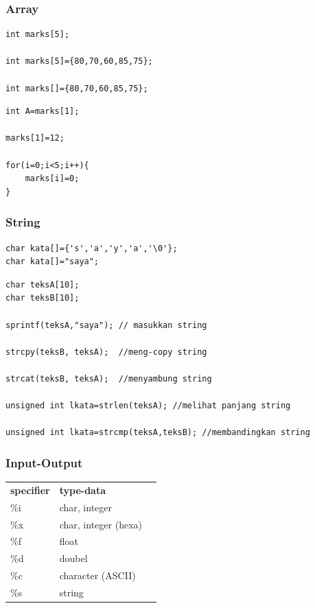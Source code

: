 \documentclass[12pt,]{article}
\begin{document}
	\subsubsection{Array}
	\begin{verbatim}
int marks[5];

int marks[5]={80,70,60,85,75};

int marks[]={80,70,60,85,75};
	\end{verbatim}
	
	\begin{verbatim}
int A=marks[1];

marks[1]=12;

for(i=0;i<5;i++){
	marks[i]=0;
}
	\end{verbatim}
	
	\subsubsection{String}
	\begin{verbatim}
char kata[]={'s','a','y','a','\0'};
char kata[]="saya";
	\end{verbatim}
	
	\begin{verbatim}
char teksA[10];
char teksB[10];

sprintf(teksA,"saya"); // masukkan string

strcpy(teksB, teksA);  //meng-copy string

strcat(teksB, teksA);  //menyambung string

unsigned int lkata=strlen(teksA); //melihat panjang string

unsigned int lkata=strcmp(teksA,teksB); //membandingkan string
	\end{verbatim}
	
	\subsubsection{Input-Output}
	\begin{table}[H]
		\begin{tabular}{|l|l|l}
			\cline{1-2}
			\textbf{specifier} & \textbf{type-data} \\ \cline{1-2}
			\%i & char, integer \\ \cline{1-2}
			\%x & char, integer (hexa) \\ \cline{1-2}
			\%f & float \\ \cline{1-2}
			\%d & doubel \\ \cline{1-2}
			\%c & character (ASCII) \\ \cline{1-2}
			\%s & string \\ \cline{1-2}
		\end{tabular}
	\end{table}
	
\end{document}
